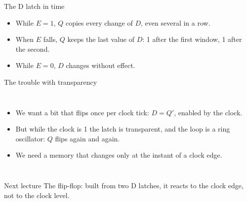 \documentclass[10pt]{wosm-slides}
\begin{document}
\begin{frame}{The D latch in time}
  \begin{center}
  \end{center}

  \begin{itemize}
    \item While $E = 1$, $Q$ copies every change of $D$, even several in a row.
    \item When $E$ falls, $Q$ keeps the last value of $D$: 1 after the first window,
      1 after the second.
    \item While $E = 0$, $D$ changes without effect.
  \end{itemize}
\end{frame}

\begin{frame}{The trouble with transparency}
  \begin{columns}[c, totalwidth=\textwidth]
      \centering
      \begin{itemize}
        \item We want a bit that flips once per clock tick: $D = Q'$, enabled by the
          clock.
        \item But while the clock is 1 the latch is transparent, and the loop is a ring
          oscillator: $Q$ flips again and again.
        \item We need a memory that changes only at the \alert{instant} of a clock
          edge.
      \end{itemize}
  \end{columns}

  \bigskip
  \begin{block}{Next lecture}
    The flip-flop: built from two D latches, it reacts to the clock edge, not to the
    clock level.
  \end{block}
\end{frame}
\end{document}
